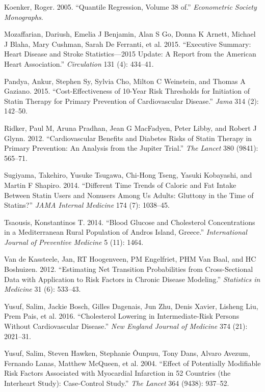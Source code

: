 \documentclass[
  12pt,
]{article}
\begin{document}
\leavevmode\hypertarget{ref-koenker2005}{}%
Koenker, Roger. 2005. ``Quantile Regression, Volume 38 of.'' \emph{Econometric Society Monographs}.

\leavevmode\hypertarget{ref-mozaffarian2015executive}{}%
Mozaffarian, Dariush, Emelia J Benjamin, Alan S Go, Donna K Arnett, Michael J Blaha, Mary Cushman, Sarah De Ferranti, et al. 2015. ``Executive Summary: Heart Disease and Stroke Statistics---2015 Update: A Report from the American Heart Association.'' \emph{Circulation} 131 (4): 434--41.

\leavevmode\hypertarget{ref-pandya2015}{}%
Pandya, Ankur, Stephen Sy, Sylvia Cho, Milton C Weinstein, and Thomas A Gaziano. 2015. ``Cost-Effectiveness of 10-Year Risk Thresholds for Initiation of Statin Therapy for Primary Prevention of Cardiovascular Disease.'' \emph{Jama} 314 (2): 142--50.

\leavevmode\hypertarget{ref-ridker2012}{}%
Ridker, Paul M, Aruna Pradhan, Jean G MacFadyen, Peter Libby, and Robert J Glynn. 2012. ``Cardiovascular Benefits and Diabetes Risks of Statin Therapy in Primary Prevention: An Analysis from the Jupiter Trial.'' \emph{The Lancet} 380 (9841): 565--71.

\leavevmode\hypertarget{ref-sugiyama2014}{}%
Sugiyama, Takehiro, Yusuke Tsugawa, Chi-Hong Tseng, Yasuki Kobayashi, and Martin F Shapiro. 2014. ``Different Time Trends of Caloric and Fat Intake Between Statin Users and Nonusers Among Us Adults: Gluttony in the Time of Statins?'' \emph{JAMA Internal Medicine} 174 (7): 1038--45.

\leavevmode\hypertarget{ref-tsaousis2014}{}%
Tsaousis, Konstantinos T. 2014. ``Blood Glucose and Cholesterol Concentrations in a Mediterranean Rural Population of Andros Island, Greece.'' \emph{International Journal of Preventive Medicine} 5 (11): 1464.

\leavevmode\hypertarget{ref-van2012estimating}{}%
Van de Kassteele, Jan, RT Hoogenveen, PM Engelfriet, PHM Van Baal, and HC Boshuizen. 2012. ``Estimating Net Transition Probabilities from Cross-Sectional Data with Application to Risk Factors in Chronic Disease Modeling.'' \emph{Statistics in Medicine} 31 (6): 533--43.

\leavevmode\hypertarget{ref-yusuf2016}{}%
Yusuf, Salim, Jackie Bosch, Gilles Dagenais, Jun Zhu, Denis Xavier, Lisheng Liu, Prem Pais, et al. 2016. ``Cholesterol Lowering in Intermediate-Risk Persons Without Cardiovascular Disease.'' \emph{New England Journal of Medicine} 374 (21): 2021--31.

\leavevmode\hypertarget{ref-yusuf2004effect}{}%
Yusuf, Salim, Steven Hawken, Stephanie Ôunpuu, Tony Dans, Alvaro Avezum, Fernando Lanas, Matthew McQueen, et al. 2004. ``Effect of Potentially Modifiable Risk Factors Associated with Myocardial Infarction in 52 Countries (the Interheart Study): Case-Control Study.'' \emph{The Lancet} 364 (9438): 937--52.
\end{document}
